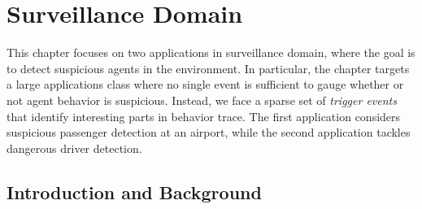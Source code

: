 
%
%
\chapter{Surveillance Domain}
\label{chap:lax}
% 

This chapter focuses on two applications in surveillance domain, where the goal is to detect suspicious agents in the environment. In particular, the chapter targets a large applications class where no single event is sufficient to gauge whether or not agent behavior is suspicious. Instead, we face a sparse set of \emph{trigger events} that identify interesting parts in behavior trace. The first application considers suspicious passenger detection at an airport, while the second application tackles dangerous driver detection.


\section{Introduction and Background}


